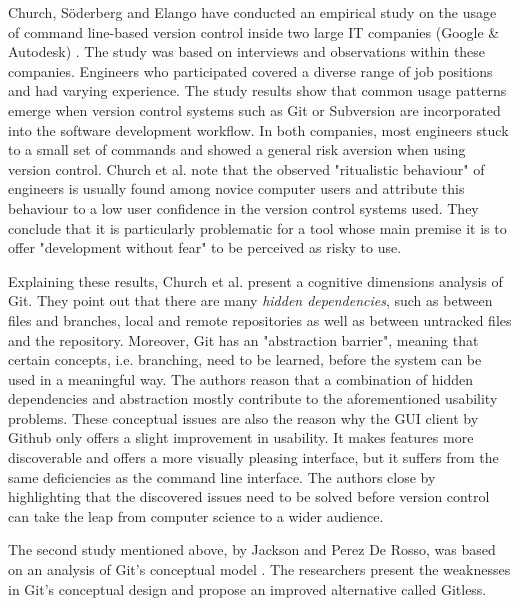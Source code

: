Church, Söderberg and Elango have conducted an empirical study on the usage of command line-based version control inside two large IT companies (Google \& Autodesk) \cite{church_case_2014}. The study was based on interviews and observations within these companies. Engineers who participated covered a diverse range of job positions and had varying experience. The study results show that common usage patterns emerge when version control systems such as Git or Subversion are incorporated into the software development workflow. In both companies, most engineers stuck to a small set of commands and showed a general risk aversion when using version control. Church et al. note that the observed "ritualistic behaviour" of engineers is usually found among novice computer users and attribute this behaviour to a low user confidence in the version control systems used. They conclude that it is particularly problematic for a tool whose main premise it is to offer "development without fear" to be perceived as risky to use.

Explaining these results, Church et al. present a cognitive dimensions analysis of Git. They point out that there are many \textit{hidden dependencies}, such as between files and branches, local and remote repositories as well as between untracked files and the repository. Moreover, Git has an "abstraction barrier", meaning that certain concepts, i.e. branching, need to be learned, before the system can be used in a meaningful way. The authors reason that a combination of hidden dependencies and abstraction mostly contribute to the aforementioned usability problems. These conceptual issues are also the reason why the \ac{GUI} client by Github \cite{_github_????} only offers a slight improvement in usability. It makes features more discoverable and offers a more visually pleasing interface, but it suffers from the same deficiencies as the command line interface. The authors close by highlighting that the discovered issues need to be solved before version control can take the leap from computer science to a wider audience.

\setlength{\parskip}{1em}
\noindent The second study mentioned above, by Jackson and Perez De Rosso, was based on an analysis of Git's conceptual model \cite{perez_de_rosso_whats_2013}. The researchers present the weaknesses in Git's conceptual design and propose an improved alternative called Gitless.

